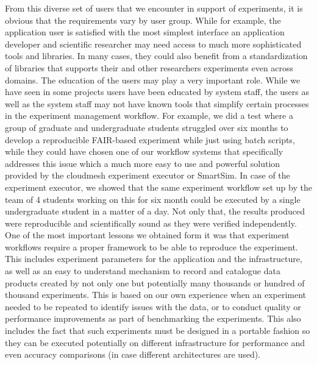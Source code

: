 \documentclass[utf8]{FrontiersinVancouver} %
\begin{document}
From this diverse set of users that we encounter in support of experiments, it is obvious that the requirements vary by user group. While for example, the application user is satisfied with the most simplest interface an application developer and scientific researcher may need access to much more sophisticated tools and libraries. In many cases, they could also benefit from a standardization of libraries that supports their and other researchers experiments even across domains. The education of the users may play a very important role. While we have seen in some projects users have been educated by system staff, the users as well as the system staff may not have known tools that simplify certain processes in the experiment management workflow. For example, we did a test where a group of graduate and undergraduate students struggled over six months to develop a reproducible FAIR-based experiment while just using batch scripts, while they could have chosen one of our workflow systems that specifically addresses this issue which a much more easy to use and powerful solution provided by the cloudmesh experiment executor or SmartSim. In case of the experiment executor, we showed that the same experiment workflow set up by the team of 4 students working on this for six month could be executed by a single undergraduate student in a matter of a day. Not only that, the results produced were reproducible and scientifically sound as they were verified independently. 
One of the most important lessons we obtained form it was that experiment workflows require a proper framework to be able to reproduce the experiment. This includes experiment parameters for the application and the infrastructure, as well as an easy to understand mechanism to record and catalogue data products created by not only one but potentially many thousands or hundred of thousand experiments. This is based on our own experience when an experiment needed to be repeated to identify issues with the data, or to conduct quality or performance improvements as part of benchmarking the experiments. This also includes the fact that such experiments must be designed in a portable fashion so they can be executed potentially on different infrastructure for performance and even accuracy comparisons (in case different architectures are used).
\end{document}
